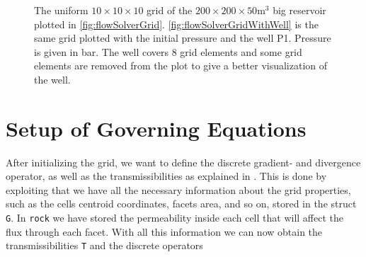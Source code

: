 \begin{figure}[H]
\begin{subfigure}[t]{0.48\textwidth}
        \caption{}
        \label{fig:flowSolverGridWithWell}
    \end{subfigure}
    \caption{The uniform $10\times 10 \times 10$ grid of the $200\times 200 \times 50 \text{m}^3$ big reservoir plotted in \autoref{fig:flowSolverGrid}. \autoref{fig:flowSolverGridWithWell} is the same grid plotted with the initial pressure and the well P1. Pressure is given in bar. The well covers 8 grid elements and some grid elements are removed from the plot to give a better visualization of the well.}
\end{figure}

\section{Setup of Governing Equations}
\label{sec:setupGovEq}
After initializing the grid, we want to define the discrete gradient- and divergence operator, as well as the transmissibilities as explained in . This is done by exploiting that we have all the necessary information about the grid properties, such as the cells centroid coordinates, facets area, and so on, stored in the struct \texttt{G}. In \texttt{rock} we have stored the permeability inside each cell that will affect the flux through each facet. With all this information we can now obtain the transmissibilities \texttt{T} and the discrete operators


